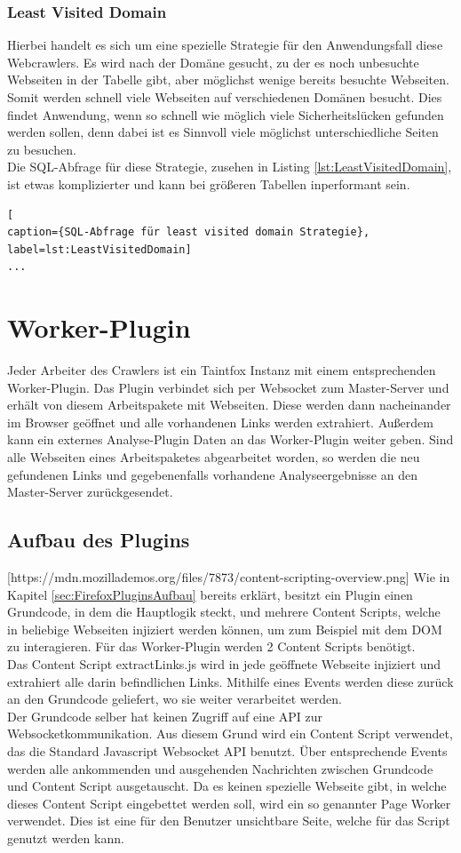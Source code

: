 \subsubsection{Least Visited Domain}
Hierbei handelt es sich um eine spezielle Strategie für den Anwendungsfall diese Webcrawlers. Es wird nach der Domäne gesucht, zu der es noch unbesuchte Webseiten in der Tabelle gibt, aber möglichst wenige bereits besuchte Webseiten. Somit werden schnell viele Webseiten auf verschiedenen Domänen besucht. Dies findet Anwendung, wenn so schnell wie möglich viele Sicherheitslücken gefunden werden sollen, denn dabei ist es Sinnvoll viele möglichst unterschiedliche Seiten zu besuchen. \\
Die SQL-Abfrage für diese Strategie, zusehen in Listing \ref{lst:LeastVisitedDomain}, ist etwas komplizierter und kann bei größeren Tabellen inperformant sein.

\begin{lstlisting}[
caption={SQL-Abfrage für least visited domain Strategie},
label=lst:LeastVisitedDomain]
...
\end{lstlisting}

\section{Worker-Plugin}
Jeder Arbeiter des Crawlers ist ein Taintfox Instanz mit einem entsprechenden Worker-Plugin. Das Plugin verbindet sich per Websocket zum Master-Server und erhält von diesem Arbeitspakete mit Webseiten. Diese werden dann nacheinander im Browser geöffnet und alle vorhandenen Links werden extrahiert. Außerdem kann ein externes Analyse-Plugin Daten an das Worker-Plugin weiter geben. Sind alle Webseiten eines Arbeitspaketes abgearbeitet worden, so werden die neu gefundenen Links und gegebenenfalls vorhandene Analyseergebnisse an den Master-Server zurückgesendet.
\subsection{Aufbau des Plugins}
 [https://mdn.mozillademos.org/files/7873/content-scripting-overview.png]
Wie in Kapitel \ref{sec:FirefoxPluginsAufbau} bereits erklärt, besitzt ein Plugin einen Grundcode, in dem die Hauptlogik steckt, und mehrere Content Scripts, welche in beliebige Webseiten injiziert werden können, um zum Beispiel mit dem DOM zu interagieren. Für das Worker-Plugin werden 2 Content Scripts benötigt. \\
Das Content Script extractLinks.js wird in jede geöffnete Webseite injiziert und extrahiert alle darin befindlichen Links. Mithilfe eines Events werden diese zurück an den Grundcode geliefert, wo sie weiter verarbeitet werden. \\
Der Grundcode selber hat keinen Zugriff auf eine API zur Websocketkommunikation. Aus diesem Grund wird ein Content Script verwendet, das die Standard Javascript Websocket API benutzt. Über entsprechende Events werden alle ankommenden und ausgehenden Nachrichten zwischen Grundcode und Content Script ausgetauscht. Da es keinen spezielle Webseite gibt, in welche dieses Content Script eingebettet werden soll, wird ein so genannter Page Worker verwendet. Dies ist eine für den Benutzer unsichtbare Seite, welche für das Script genutzt werden kann.
